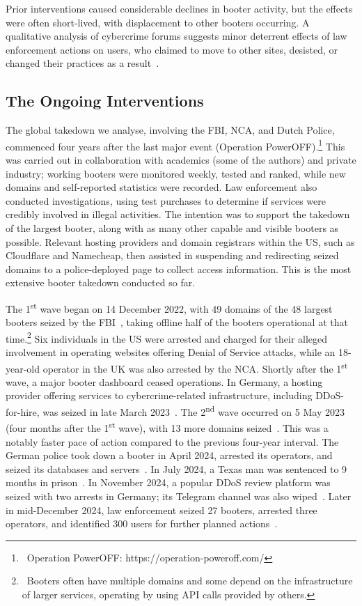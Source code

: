 \documentclass[letterpaper,twocolumn,10pt]{article}
\begin{document}
Prior interventions caused considerable declines in booter activity, but the effects were often short-lived, with displacement to other booters occurring. A qualitative analysis of cybercrime forums suggests minor deterrent effects of law enforcement actions on users, who claimed to move to other sites, desisted, or changed their practices as a result~\cite{decary2023like}.

\subsection{The Ongoing Interventions} \label{subsec:the-recent-takedown}
The global takedown we analyse, involving the FBI, NCA, and Dutch Police, commenced four years after the last major event (Operation PowerOFF).\footnote{~Operation PowerOFF: https://operation-poweroff.com/} This was carried out in collaboration with academics (some of the authors) and private industry; working booters were monitored weekly, tested and ranked, while new domains and self-reported statistics were recorded. Law enforcement also conducted investigations, using test purchases to determine if services were credibly involved in illegal activities. The intention was to support the takedown of the largest booter, along with as many other capable and visible booters as possible. Relevant hosting providers and domain registrars within the US, such as Cloudflare and Namecheap, then assisted in suspending and redirecting seized domains to a police-deployed page to collect access information. This is the most extensive booter takedown conducted so far.

The 1\textsuperscript{st} wave began on 14 December 2022, with 49 domains of the 48 largest booters seized by the FBI~\cite{booterseizure2022}, taking offline half of the booters operational at that time.\footnote{~Booters often have multiple domains and some depend on the infrastructure of larger services, operating by using API calls provided by others.} Six individuals in the US were arrested and charged for their alleged involvement in operating websites offering Denial of Service attacks, while an 18-year-old operator in the UK was also arrested by the NCA. Shortly after the 1\textsuperscript{st} wave, a major booter dashboard ceased operations. In Germany, a hosting provider offering services to cybercrime-related infrastructure, including DDoS-for-hire, was seized in late March 2023~\cite{germanseizedbooters}. The 2\textsuperscript{nd} wave occurred on 5 May 2023 (four months after the 1\textsuperscript{st} wave), with 13 more domains seized~\cite{seized13moredomains}. This was a notably faster pace of action compared to the previous four-year interval. The German police took down a booter in April 2024, arrested its operators, and seized its databases and servers~\cite{stressertechseizure}. In July 2024, a Texas man was sentenced to 9 months in prison~\cite{texasmansentenced}. In November 2024, a popular DDoS review platform was seized with two arrests in Germany; its Telegram channel was also wiped~\cite{dstatccseized}. Later in mid-December 2024, law enforcement seized 27 booters, arrested three operators, and identified 300 users for further planned actions~\cite{bootertakedown2024}.
\end{document}
